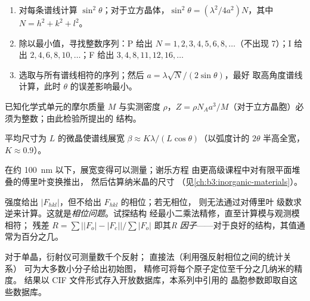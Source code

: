 \begin{method}[立方晶系粉末图的指标化]\label{met:b3:x-ray-diffraction:index-cubic}
\begin{enumerate}
  \item 对每条谱线计算 $\sin^2\theta$；对于立方晶体，$\sin^2\theta =
        (\lambda^2/4a^2)N$，其中 $N = h^2 + k^2 + l^2$。
  \item 除以最小值，寻找整数序列：P 给出
        $N = 1, 2, 3, 4, 5, 6, 8, \dots$（不出现 7）；I 给出 $2, 4, 6, 8, 10, \dots$；F 给出
        $3, 4, 8, 11, 12, 16, \dots$
  \item 选取与所有谱线相符的序列；然后 $a = \lambda\sqrt N/(2\sin\theta)$，最好
        取高角度谱线计算，此时 $\theta$ 的误差影响最小。
\end{enumerate}
\end{method}

\begin{method}[晶胞中的化学式单元数]\label{met:b3:x-ray-diffraction:z-from-density}
已知化学式单元的摩尔质量 $M$ 与实测密度 $\rho$，$Z =
\rho N_Aa^3/M$（对于立方晶胞）必须为整数；由此检验所提出的
结构。
\end{method}

\begin{proposition}[谢乐方程]\label{prop:b3:x-ray-diffraction:scherrer}
平均尺寸为 $L$ 的微晶使谱线展宽 $\beta \approx K\lambda/(L\cos\theta)$（以弧度计的 $2\theta$
半高全宽，$K \approx 0.9$）。
\end{proposition}
\admitted

在约 \qty{100}{nm} 以下，展宽变得可以测量；谢乐方程
由更高级课程中对有限平面堆叠的傅里叶变换推出，
然后估算纳米晶的尺寸
（见\cref{ch:b3:inorganic-materials}）。

\begin{definition}[相位问题，R 因子]\label{def:b3:x-ray-diffraction:refinement}
强度给出 $|F_{hkl}|$，但不给出 $F_{hkl}$ 的相位；若无相位，
则无法通过对傅里叶
级数求逆来计算。这就是\emph{相位问题}。试探结构
经最小二乘法精修，直至计算模与观测模相符；
残差 $R = \sum\big||F_o| - |F_c|\big|/\sum|F_o|$ 即其\emph{R
因子}——对于良好的结构，其值通常为百分之几。
\end{definition}

对于单晶，衍射仪可测量数千个反射；
直接法（利用强反射相位之间的统计关系）
可为大多数小分子给出初始图，
精修可将每个原子定位至千分之几纳米的精度。
结果以 CIF 文件形式存入开放数据库，本系列中引用的
晶胞参数即取自这些数据库。

